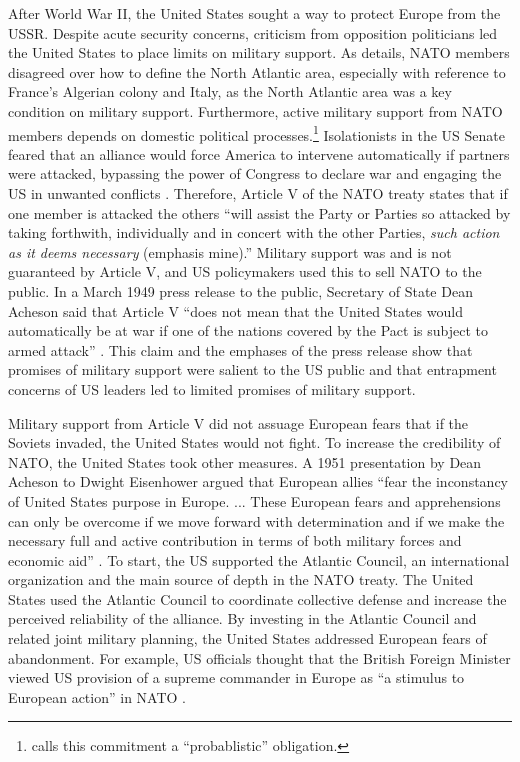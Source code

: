 \documentclass[12pt]{article}
\begin{document}
After World War II, the United States sought a way to protect Europe from the USSR. 
Despite acute security concerns, criticism from opposition politicians led the United States to place limits on military support. 
As \citet{Poast2019a} details, NATO members disagreed over how to define the North Atlantic area, especially with reference to France's Algerian colony and Italy, as the North Atlantic area was a key condition on military support. 
Furthermore, active military support from NATO members depends on domestic political processes.\footnote{\citet{Benson2012} calls this commitment a ``probablistic'' obligation.} 
Isolationists in the US Senate feared that an alliance would force America to intervene automatically if partners were attacked, bypassing the power of Congress to declare war and engaging the US in unwanted conflicts \citep[pg. 280-1]{Acheson1969}.
Therefore, Article V of the NATO treaty states that if one member is attacked the others ``will assist the Party or Parties so attacked by taking forthwith, individually and in concert with the other Parties, \emph{such action as it deems necessary} (emphasis mine).'' 
Military support was and is not guaranteed by Article V, and US policymakers used this to sell NATO to the public. 
In a March 1949 press release to the public, Secretary of State Dean Acheson said that Article V ``does not mean that the United States would automatically be at war if one of the nations covered by the Pact is subject to armed attack'' \citep{Acheson1949}.
This claim and the emphases of the press release show that promises of military support were salient to the US public and that entrapment concerns of US leaders led to limited promises of military support. 


Military support from Article V did not assuage European fears that if the Soviets invaded, the United States would not fight. 
To increase the credibility of NATO, the United States took other measures.  
A 1951 presentation by Dean Acheson to Dwight Eisenhower argued that European allies ``fear the inconstancy of United States purpose in Europe. ... These European fears and apprehensions can only be overcome if we move forward with determination and if we make the necessary full and active contribution in terms of both military forces and economic aid'' \citep[pg. 3]{Acheson1951}. 
To start, the US supported the Atlantic Council, an international organization and the main source of depth in the NATO treaty. 
The United States used the Atlantic Council to coordinate collective defense and increase the perceived reliability of the alliance. 
By investing in the Atlantic Council and related joint military planning, the United States addressed European fears of abandonment. 
For example, US officials thought that the British Foreign Minister viewed US provision of a supreme commander in Europe as ``a stimulus to European action'' in NATO \citep{Acheson1950}. 
\end{document}
